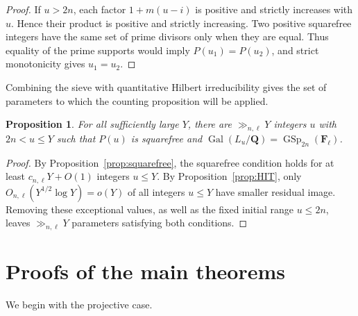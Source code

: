 \documentclass[11pt,hidelinks]{amsart}
\newtheorem{proposition}[theorem]{Proposition}
\newcommand{\Q}{\mathbf Q}
\newcommand{\F}{\mathbf F}
\newcommand{\Gal}{\operatorname{Gal}}
\newcommand{\GSp}{\operatorname{GSp}}
\begin{document}
\begin{proof}
If $u>2n$, each factor $1+m(u-i)$ is positive and strictly increases with $u$. Hence their product is positive and strictly increasing. Two positive squarefree integers have the same set of prime divisors only when they are equal. Thus equality of the prime supports would imply $P(u_1)=P(u_2)$, and strict monotonicity gives $u_1=u_2$.
\end{proof}

Combining the sieve with quantitative Hilbert irreducibility gives the set of parameters to which the counting proposition will be applied.

\begin{proposition}\label{prop:good-parameters}
For all sufficiently large $Y$, there are $\gg_{n,\ell}Y$ integers $u$ with $2n<u\leq Y$ such that $P(u)$ is squarefree and
$\Gal(L_u/\Q)=\GSp_{2n}(\F_\ell)$.
\end{proposition}

\begin{proof}
By Proposition~\ref{prop:squarefree}, the squarefree condition holds for at least $c_{n,\ell}Y+O(1)$ integers $u\leq Y$. By Proposition~\ref{prop:HIT}, only $O_{n,\ell}(Y^{1/2}\log Y)=o(Y)$ of all integers $u\leq Y$ have smaller residual image. Removing these exceptional values, as well as the fixed initial range $u\leq2n$, leaves $\gg_{n,\ell}Y$ parameters satisfying both conditions.
\end{proof}

\section{Proofs of the main theorems}\label{sec:proofs}

We begin with the projective case.
\end{document}
